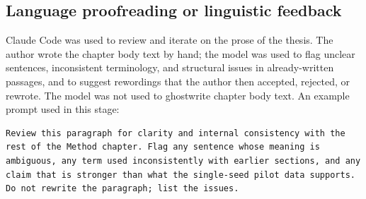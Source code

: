 \subsection*{Language proofreading or linguistic feedback}
Claude Code \cite{claude-code} was used to review and iterate on the
prose of the thesis. The author wrote the chapter body text by hand;
the model was used to flag unclear sentences, inconsistent terminology,
and structural issues in already-written passages, and to suggest
rewordings that the author then accepted, rejected, or rewrote. The
model was not used to ghostwrite chapter body text. An example prompt
used in this stage:

\noindent\begin{minipage}{\linewidth}
\begin{lstlisting}[style=prompt]
Review this paragraph for clarity and internal consistency with the rest of the Method chapter. Flag any sentence whose meaning is ambiguous, any term used inconsistently with earlier sections, and any claim that is stronger than what the single-seed pilot data supports. Do not rewrite the paragraph; list the issues.
\end{lstlisting}
\end{minipage}
